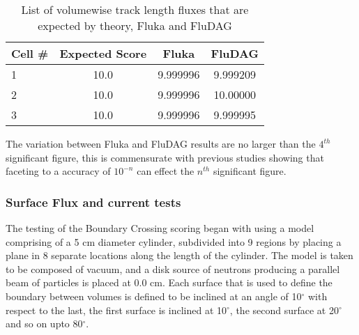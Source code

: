 \documentclass{anstrans}[11pt]
\begin{document}
\begin{table}[h!]
	\begin{center}
		\begin{tabular}{|l|c|c|c|}
			\hline
			Cell \# & Expected Score & Fluka  & FluDAG \\
			\hline
			1 & 10.0 & 9.999996 & 9.999209 \\
			2 & 10.0 & 9.999996 & 10.00000 \\
			3 & 10.0 & 9.999996 & 9.999995 \\
			\hline
		\end{tabular}
		\caption{List of volumewise track length fluxes that are 
			expected by theory, Fluka and FluDAG}
	\end{center}
\label{table:usrtrack_comp_sphere}
\end{table}

The variation between Fluka and FluDAG results are no larger than the
$4^{th}$ significant figure, this is commensurate with previous
studies \cite{snouffer_ans} showing that faceting to a accuracy of $10^{-n}$ can
effect the $n^{th}$ significant figure. 

\subsubsection*{Surface Flux and current tests}
The testing of the Boundary Crossing scoring began with using a model
comprising of a 5 cm diameter cylinder, subdivided into 9 regions by
placing a plane in 8 separate locations along the length of the
cylinder. The model is taken to be composed of vacuum, and a disk
source of neutrons producing a parallel beam of particles is placed at
0.0 cm. Each surface that is used to define the boundary between
volumes is defined to be inclined at an angle of 10$^{\circ}$ with respect to the
last, the first surface is inclined at 10$^{\circ}$, the second
surface at 20$^{\circ}$ and so on upto 80$^{\circ}$.

\end{document}
